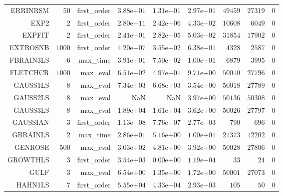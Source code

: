 \begin{longtable}{rrrrrrrrr}
ERRINRSM & \(    50\) & first\_order & \( 3.88\)e\(+01\) & \( 1.31\)e\(-01\) & \( 2.97\)e\(-01\) & \( 49459\) & \( 27319\) & \(     0\) \\
EXP2 & \(     2\) & first\_order & \( 2.80\)e\(-11\) & \( 2.42\)e\(-06\) & \( 4.33\)e\(-02\) & \( 10608\) & \(  6049\) & \(     0\) \\
EXPFIT & \(     2\) & first\_order & \( 2.41\)e\(-01\) & \( 2.82\)e\(-05\) & \( 5.03\)e\(-02\) & \( 31854\) & \( 17902\) & \(     0\) \\
EXTROSNB & \(  1000\) & first\_order & \( 4.20\)e\(-07\) & \( 3.55\)e\(-02\) & \( 6.38\)e\(-01\) & \(  4328\) & \(  2587\) & \(     0\) \\
FBRAIN3LS & \(     6\) & max\_time & \( 3.91\)e\(-01\) & \( 7.50\)e\(-02\) & \( 1.00\)e\(+01\) & \(  6879\) & \(  3995\) & \(     0\) \\
FLETCHCR & \(  1000\) & max\_eval & \( 6.51\)e\(-02\) & \( 4.97\)e\(-01\) & \( 9.71\)e\(+00\) & \( 50010\) & \( 27796\) & \(     0\) \\
GAUSS1LS & \(     8\) & max\_eval & \( 7.34\)e\(+03\) & \( 6.68\)e\(+03\) & \( 3.54\)e\(+00\) & \( 50018\) & \( 27789\) & \(     0\) \\
GAUSS2LS & \(     8\) & max\_eval &       NaN &       NaN & \( 3.97\)e\(+00\) & \( 50136\) & \( 50308\) & \(     0\) \\
GAUSS3LS & \(     8\) & max\_eval & \( 1.89\)e\(+04\) & \( 1.61\)e\(+04\) & \( 3.62\)e\(+00\) & \( 50026\) & \( 27797\) & \(     0\) \\
GAUSSIAN & \(     3\) & first\_order & \( 1.13\)e\(-08\) & \( 7.76\)e\(-07\) & \( 2.77\)e\(-03\) & \(   790\) & \(   696\) & \(     0\) \\
GBRAINLS & \(     2\) & max\_time & \( 2.86\)e\(+01\) & \( 5.16\)e\(+00\) & \( 1.00\)e\(+01\) & \( 21373\) & \( 12202\) & \(     0\) \\
GENROSE & \(   500\) & max\_eval & \( 3.03\)e\(+02\) & \( 4.81\)e\(+00\) & \( 3.92\)e\(+00\) & \( 50028\) & \( 27806\) & \(     0\) \\
GROWTHLS & \(     3\) & first\_order & \( 3.54\)e\(+03\) & \( 0.00\)e\(+00\) & \( 1.19\)e\(-04\) & \(    33\) & \(    24\) & \(     0\) \\
GULF & \(     3\) & max\_eval & \( 6.54\)e\(+00\) & \( 1.35\)e\(+00\) & \( 1.72\)e\(+00\) & \( 50001\) & \( 27073\) & \(     0\) \\
HAHN1LS & \(     7\) & first\_order & \( 5.55\)e\(+04\) & \( 4.33\)e\(-04\) & \( 2.93\)e\(-03\) & \(   105\) & \(    50\) & \(     0\) \\

\end{longtable}
